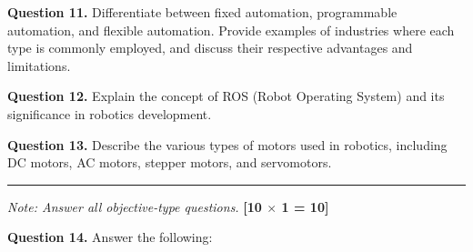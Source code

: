 \documentclass[11pt,a4paper]{article}
\begin{document}
\medskip


\noindent   \textbf{Question 11.} Differentiate between fixed automation, programmable automation, and flexible automation. Provide examples of industries where each type is commonly employed, and discuss their respective advantages and limitations.

\medskip


\noindent   \textbf{Question 12.} Explain the concept of ROS (Robot Operating System) and its significance in robotics development.

\medskip


\noindent   \textbf{Question 13.} Describe the various types of motors used in robotics, including DC motors, AC motors, stepper motors, and servomotors.

\bigskip


\rule{\linewidth}{0.4pt}\smallskip




\noindent   \textit{Note: Answer all objective-type questions.} \hfill   \textbf{[10 $ \times$ 1 = 10]}

\medskip


\noindent   \textbf{Question 14.} Answer the following:
\end{document}
